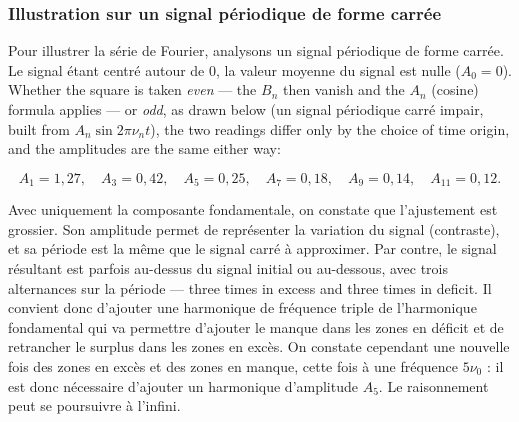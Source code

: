 \subsubsection{Illustration sur un signal périodique de forme carrée}

Pour illustrer la série de Fourier, analysons un signal périodique de forme
carrée. Le signal étant centré autour de 0, la valeur moyenne du signal est nulle
($A_0=0$). Whether the square is taken \emph{even} --- the $B_n$ then vanish and
the $A_n$ (cosine) formula applies --- or \emph{odd}, as drawn below (un signal
périodique carré impair, built from $A_n\sin 2\pi\nu_nt$), the two readings
differ only by the choice of time origin, and the amplitudes are the same either
way:

\[
  A_1=1{,}27,\quad A_3=0{,}42,\quad A_5=0{,}25,\quad A_7=0{,}18,
  \quad A_9=0{,}14,\quad A_{11}=0{,}12 .
\]

Avec uniquement la composante fondamentale, on constate que l'ajustement est
grossier. Son amplitude permet de représenter la variation du signal (contraste),
et sa période est la même que le signal carré à approximer. Par contre, le signal
résultant est parfois au-dessus du signal initial ou au-dessous, avec trois
alternances sur la période --- three times in excess and three times in deficit.
Il convient donc d'ajouter une harmonique de fréquence triple de l'harmonique
fondamental qui va permettre d'ajouter le manque dans les zones en déficit et de
retrancher le surplus dans les zones en excès. On constate cependant une
nouvelle fois des zones en excès et des zones en manque, cette fois à une
fréquence $5\nu_0$ : il est donc nécessaire d'ajouter un harmonique d'amplitude
$A_5$. Le raisonnement peut se poursuivre à l'infini.

